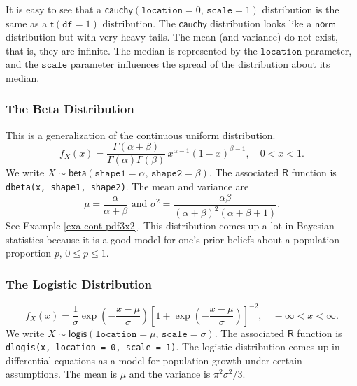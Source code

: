 \documentclass[captions=tableheading]{scrbook}
\begin{document}
It is easy to see that a \(\mathsf{cauchy}(\mathtt{location}=0,\,\mathtt{scale}=1)\) distribution is the same as a \(\mathsf{t}(\mathtt{df}=1)\) distribution. The \(\mathsf{cauchy}\) distribution looks like a \(\mathsf{norm}\) distribution but with very heavy tails. The mean (and variance) do not exist, that is, they are infinite. The median is represented by the \(\mathtt{location}\) parameter, and the \(\mathtt{scale}\) parameter influences the spread of the distribution about its median.
\subsubsection{The Beta Distribution}
\label{sec-6-5-3-2}
\label{sub-The-Beta-Distribution}


This is a generalization of the continuous uniform distribution.
\begin{equation}
f_{X}(x)=\frac{\Gamma(\alpha+\beta)}{\Gamma(\alpha)\Gamma(\beta)}\, x^{\alpha-1}(1-x)^{\beta-1},\quad 0 < x < 1.
\end{equation}
We write \(X\sim\mathsf{beta}(\mathtt{shape1}=\alpha,\,\mathtt{shape2}=\beta)\). The associated \(\mathsf{R}\) function is \texttt{dbeta(x, shape1, shape2)}. The mean and variance are
\begin{equation} 
\mu=\frac{\alpha}{\alpha+\beta}\mbox{ and }\sigma^{2}=\frac{\alpha\beta}{\left(\alpha+\beta\right)^{2}\left(\alpha+\beta+1\right)}.
\end{equation}
See Example \ref{exa-cont-pdf3x2}. This distribution comes up a lot in Bayesian statistics because it is a good model for one's prior beliefs about a population proportion \(p\), \(0\leq p\leq1\).
\subsubsection{The Logistic Distribution}
\label{sec-6-5-3-3}
\label{sub-The-Logistic-Distribution}


\begin{equation}
f_{X}(x)=\frac{1}{\sigma}\exp\left(-\frac{x-\mu}{\sigma}\right)\left[1+\exp\left(-\frac{x-\mu}{\sigma}\right)\right]^{-2},\quad -\infty < x < \infty.
\end{equation}
We write \(X\sim\mathsf{logis}(\mathtt{location}=\mu,\,\mathtt{scale}=\sigma)\). The associated \(\mathsf{R}\) function is \texttt{dlogis(x, location = 0, scale = 1)}. The logistic distribution comes up in differential equations as a model for population growth under certain assumptions. The mean is \(\mu\) and the variance is \(\pi^{2}\sigma^{2}/3\).
\end{document}
